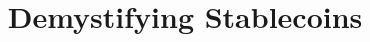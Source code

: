 \documentclass[letterpaper]{article}
\begin{document}
\title{Demystifying Stablecoins}
\author{}\date{}

\maketitle


\begin{abstract}

\end{abstract}







%

\end{document}
